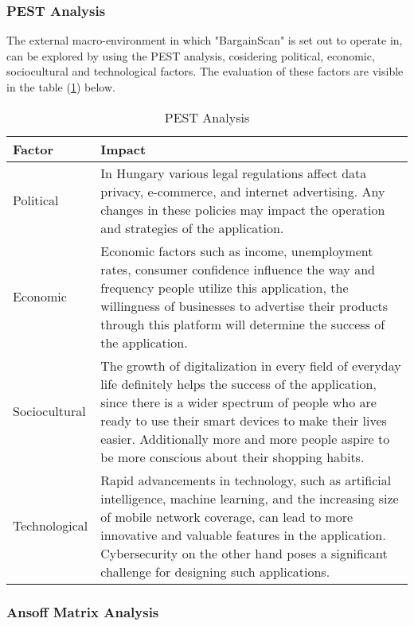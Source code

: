\pagebreak

\subsubsection{PEST Analysis}

The external macro-environment in which "BargainScan" is set out to operate in, can be explored by using the PEST analysis, cosidering political, economic, sociocultural and technological factors. The evaluation of these factors are visible in the table (\ref{tab:pest}) below.

\begin{table}[h]
	\centering
	\begin{tabularx}{\textwidth}{|p{2.3cm}|X|}
		\hline
		\textbf{Factor} & \textbf{Impact} \\
		\hline
		Political & In Hungary various legal regulations affect data privacy, e-commerce, and internet advertising. Any changes in these policies may impact the operation and strategies of the application. \\
		\hline
		Economic & Economic factors such as income, unemployment rates, consumer confidence influence the way and frequency people utilize this application, the willingness of businesses to advertise their products through this platform will determine the success of the application. \\
		\hline
		Sociocultural & The growth of digitalization in every field of everyday life definitely helps the success of the application, since there is a wider spectrum of people who are ready to use their smart devices to make their lives easier. Additionally more and more people aspire to be more conscious about their shopping habits.\\
		\hline
		Technological & Rapid advancements in technology, such as artificial intelligence, machine learning, and the increasing size of mobile network coverage, can lead to more innovative and valuable features in the application. Cybersecurity on the other hand poses a significant challenge for designing such applications. \\
		\hline
	\end{tabularx}
	\caption{PEST Analysis}
	\label{tab:pest}
\end{table}

\subsubsection{Ansoff Matrix Analysis}

